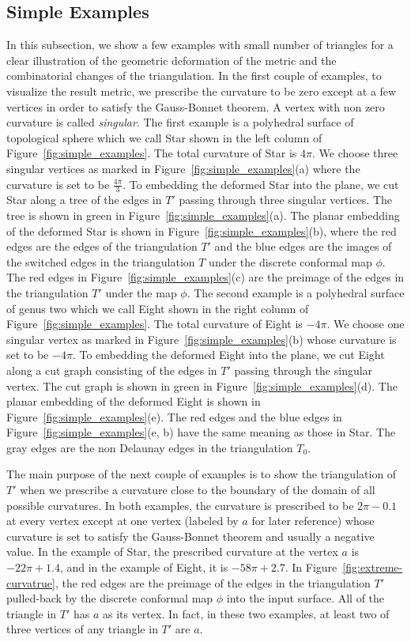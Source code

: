 \documentclass[11pt]{article}
\begin{document}
\subsection{Simple Examples}
\label{sec:simple-examples}
In this subsection, we show a few examples with small number of triangles 
for a clear illustration of the geometric deformation of the metric and the 
combinatorial changes of the triangulation. In the first couple of examples, 
to visualize the result metric, we prescribe the curvature to be zero except at 
a few vertices in order to satisfy the Gauss-Bonnet theorem. A vertex with non 
zero curvature is called {\it singular}. The first example is a polyhedral surface of 
topological sphere which we call Star shown in the left column of 
Figure~\ref{fig:simple_examples}. The total curvature 
of Star is $4\pi$. We choose three singular vertices as marked in 
Figure~\ref{fig:simple_examples}(a) where the curvature is set to be $\frac{4\pi}{3}$. 
To embedding the deformed
Star into the plane, we cut Star along a tree of the edges in $T'$ passing through three singular 
vertices. The tree is shown in green in Figure~\ref{fig:simple_examples}(a). 
The planar embedding of the deformed Star is shown in Figure~\ref{fig:simple_examples}(b),
where the red edges are the edges of the triangulation $T'$ and the blue edges are the images 
of the switched edges in the triangulation $T$ under the discrete conformal map $\phi$. 
The red edges in Figure~\ref{fig:simple_examples}(c) are the preimage of the edges in the 
triangulation $T'$ under the map $\phi$.  The second example is a polyhedral surface of 
genus two which we call Eight shown in the right column of Figure~\ref{fig:simple_examples}. 
The total curvature of Eight is $-4\pi$. We choose one singular vertex  as marked in 
Figure~\ref{fig:simple_examples}(b)  whose curvature is set to be  $-4\pi$.
To embedding the deformed Eight into the plane, we cut Eight
along a cut graph consisting of the edges in $T'$ passing through the singular vertex.
The cut graph is shown in green in Figure~\ref{fig:simple_examples}(d). 
The planar embedding of the deformed Eight is shown in Figure~\ref{fig:simple_examples}(e). 
The red edges and the blue edges in 
Figure~\ref{fig:simple_examples}(e, b) have the same meaning as those in Star. The gray edges
are the non Delaunay edges in the triangulation $T_0$. 

The main purpose of the next couple of examples is to show the triangulation of $T'$ when we 
prescribe a curvature close to the boundary of the domain of all possible curvatures. In both examples, 
the curvature is prescribed to be $2\pi -0.1$ at every vertex except at one vertex (labeled by $a$ 
for later reference) whose curvature is 
set to satisfy the Gauss-Bonnet theorem and usually a negative value. In the example of Star, the 
prescribed curvature at the vertex $a$ is $-22\pi + 1.4$, and in the example of Eight, it is $-58\pi +2.7$. 
In Figure~\ref{fig:extreme-curvatrue}, the red edges are the preimage of the edges in the triangulation $T'$
pulled-back by the discrete conformal map $\phi$ into the input surface. All of the triangle in $T'$ has 
$a$ as its vertex. In fact, in these two examples, at least two of three vertices of any triangle 
in $T'$ are $a$. 
\end{document}
